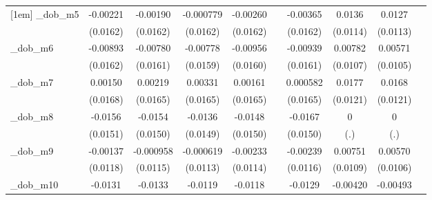 \begin{table}[htbp]
\begin{tabular}{l*{9}{c}}
[1em]
\_dob\_m5     &    -0.00221         &    -0.00190         &   -0.000779         &    -0.00260         &                     &    -0.00365         &      0.0136         &      0.0127         &                     \\
            &    (0.0162)         &    (0.0162)         &    (0.0162)         &    (0.0162)         &                     &    (0.0162)         &    (0.0114)         &    (0.0113)         &                     \\
[1em]
\_dob\_m6     &    -0.00893         &    -0.00780         &    -0.00778         &    -0.00956         &                     &    -0.00939         &     0.00782         &     0.00571         &                     \\
            &    (0.0162)         &    (0.0161)         &    (0.0159)         &    (0.0160)         &                     &    (0.0161)         &    (0.0107)         &    (0.0105)         &                     \\
[1em]
\_dob\_m7     &     0.00150         &     0.00219         &     0.00331         &     0.00161         &                     &    0.000582         &      0.0177         &      0.0168         &                     \\
            &    (0.0168)         &    (0.0165)         &    (0.0165)         &    (0.0165)         &                     &    (0.0165)         &    (0.0121)         &    (0.0121)         &                     \\
[1em]
\_dob\_m8     &     -0.0156         &     -0.0154         &     -0.0136         &     -0.0148         &                     &     -0.0167         &           0         &           0         &                     \\
            &    (0.0151)         &    (0.0150)         &    (0.0149)         &    (0.0150)         &                     &    (0.0150)         &         (.)         &         (.)         &                     \\
[1em]
\_dob\_m9     &    -0.00137         &   -0.000958         &   -0.000619         &    -0.00233         &                     &    -0.00239         &     0.00751         &     0.00570         &                     \\
            &    (0.0118)         &    (0.0115)         &    (0.0113)         &    (0.0114)         &                     &    (0.0116)         &    (0.0109)         &    (0.0106)         &                     \\
[1em]
\_dob\_m10    &     -0.0131         &     -0.0133         &     -0.0119         &     -0.0118         &                     &     -0.0129         &    -0.00420         &    -0.00493         &                     \\

\end{tabular}
\end{table}
